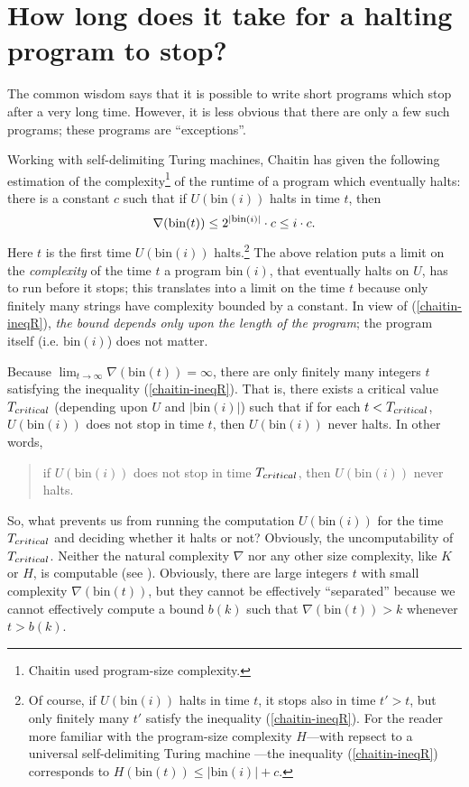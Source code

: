 \documentclass[12pt,twoside,openright]{report}
\newcommand{\bin}{\mbox{bin}}
\newcommand{\fbin}{\mbox{\rm \footnotesize{bin}}}
\begin{document}
\section{How long does it take for a halting program to stop?}

The common wisdom says that it is possible to write short programs which stop after a very long time. However, it is less obvious that there are only a few such programs; these programs are ``exceptions''. 

Working with self-delimiting Turing machines, Chaitin \cite{busy} has given the following estimation of the complexity\footnote{Chaitin used  program-size complexity.} of the runtime of a program which eventually halts: there is a constant $c$ such that if $U(\bin(i))$ halts in time $t$, then 
\begin{equation}
\label{chaitin-ineqR}\nabla (\bin (t)) \le 2^{|\fbin(i)|}\cdot c \le i\cdot c.
\end{equation} 
Here $t$ is the first time $U(\bin(i))$ halts.\footnote{Of course, if $U(\bin(i))$ halts in time $t$, it stops also in time $t'>t$, but only finitely many $t'$  satisfy the inequality (\ref{chaitin-ineqR}). For the reader more familiar with the program-size complexity $H$---with repsect to a universal self-delimiting Turing machine \cite{Calude}---the inequality (\ref{chaitin-ineqR}) corresponds to $H(\bin(t)) \le |\bin(i)| +c$.}   The above relation puts a limit on the {\it complexity}
of the time $t$ 
 a program $\bin(i)$, that eventually halts on $U$, has to run before it stops; this translates into a  limit on the  time  $t$
because only finitely many strings have complexity bounded by a constant.  In view of (\ref{chaitin-ineqR}), {\it the bound depends only upon the  length of the program}; the program itself (i.e. $\bin(i)$) does not matter.


Because $\lim_{t\rightarrow \infty}\nabla (\bin(t)) = \infty$, there are only finitely many integers $t$ satisfying the inequality (\ref{chaitin-ineqR}). That is, there exists a critical value $T_{\footnotesize critical}$ (depending upon $U$ and  $|\bin(i)|$) such that if for each $t < T_{\footnotesize critical}$, $U(\bin(i))$ does not stop in time $t$, then $U(\bin(i))$ never halts. In other words, 
\begin{quote}
if $U(\bin(i))$ does not stop in time $T_{\footnotesize critical}$, then $U(\bin(i))$ never halts. 
\end{quote}


So, what prevents us from running the computation $U(\bin(i))$ for the time $T_{\footnotesize critical}$ and deciding whether it halts or not?  Obviously, the uncomputability of $T_{\footnotesize critical}$.  Neither the natural complexity $\nabla$ nor any other size complexity, like $K$ or $H$, is computable (see \cite{Calude}).  Obviously, there are large integers $t$ with small complexity $\nabla(\bin(t))$, but they cannot be effectively ``separated'' because  we cannot effectively compute a bound $b(k)$ such that $\nabla (\bin(t))>k$ whenever $t > b(k)$.
\end{document}
